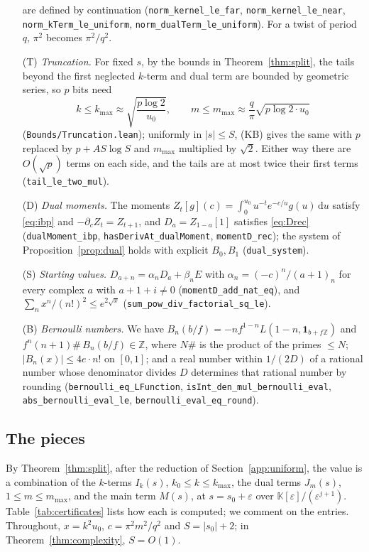 \documentclass[11pt,reqno]{amsart}
\theoremstyle{definition}
\theoremstyle{remark}
\newcommand{\dd}{\,\mathrm{d}}
\newcommand{\ZZ}{\mathbb{Z}}
\begin{document}
\begin{small}
\begin{itemize}
are defined by continuation (\nolinkurl{norm_kernel_le_far}, \nolinkurl{norm_kernel_le_near},
\nolinkurl{norm_kTerm_le_uniform}, \nolinkurl{norm_dualTerm_le_uniform}). For a twist of period $q$, $\pi^2$ becomes
$\pi^2/q^2$.
\item[(T)] \emph{Truncation.} For fixed $s$, by the bounds in Theorem~\ref{thm:split}, the tails beyond the first
neglected $k$-term and dual term are bounded by geometric series, so $p$ bits need
\begin{equation}\label{eq:counts}
  k \le k_{\max} \approx \sqrt{\frac{p\log 2}{u_0}}, \qquad m \le m_{\max} \approx \frac{q}{\pi}\sqrt{p\log 2\cdot u_0}
\end{equation}
(\nolinkurl{Bounds/Truncation.lean}); uniformly in $|s| \le S$, (KB) gives the same with $p$ replaced by
$p + AS\log S$ and $m_{\max}$ multiplied by $\sqrt2$. Either way there are $O(\sqrt p)$ terms on each side, and the
tails are at most twice their first terms (\nolinkurl{tail_le_two_mul}).
\item[(D)] \emph{Dual moments.} The moments $Z_t[g](c) = \int_0^{u_0}u^{-t}e^{-c/u}g(u)\dd u$ satisfy
\eqref{eq:ibp} and $-\partial_cZ_t = Z_{t+1}$, and $D_a = Z_{1-a}[1]$ satisfies \eqref{eq:Drec}
(\nolinkurl{dualMoment_ibp}, \nolinkurl{hasDerivAt_dualMoment}, \nolinkurl{momentD_rec}); the system of
Proposition~\ref{prop:dual} holds with explicit $B_0, B_1$ (\nolinkurl{dual_system}).
\item[(S)] \emph{Starting values.} $D_{a+n} = \alpha_nD_a + \beta_nE$ with $\alpha_n = (-c)^n/(a+1)_n$ for every
complex $a$ with $a + 1 + i \ne 0$ (\nolinkurl{momentD_add_nat_eq}), and $\sum_nx^n/(n!)^2 \le e^{2\sqrt x}$
(\nolinkurl{sum_pow_div_factorial_sq_le}).
\item[(B)] \emph{Bernoulli numbers.} We have $B_n(b/f) = -nf^{1-n}L(1-n, \mathbf 1_{b+f\ZZ})$ and
$f^n(n+1)\#\,B_n(b/f) \in \ZZ$, where $N\#$ is the product of the primes $\le N$; $|B_n(x)| \le 4e\cdot n!$ on $[0,1]$; and a real number within $1/(2D)$ of a rational number whose denominator divides
$D$ determines that rational number by rounding (\nolinkurl{bernoulli_eq_LFunction}, \nolinkurl{isInt_den_mul_bernoulli_eval},
\nolinkurl{abs_bernoulli_eval_le}, \nolinkurl{bernoulli_eval_eq_round}).
\end{itemize}

\subsection{The pieces}\label{app:pieces}
By Theorem~\ref{thm:split}, after the reduction of Section~\ref{app:uniform}, the value is a combination of the
$k$-terms $I_k(s)$, $k_0 \le k \le k_{\max}$, the dual terms $J_m(s)$, $1 \le m \le m_{\max}$, and the main term
$M(s)$, at $s = s_0 + \varepsilon$ over $\mathbb K[\varepsilon]/(\varepsilon^{j+1})$. Table~\ref{tab:certificates}
lists how each is computed; we comment on the entries. Throughout, $x = k^2u_0$, $c = \pi^2m^2/q^2$ and
$S = |s_0| + 2$; in Theorem~\ref{thm:complexity}, $S = O(1)$.


\end{small}
\end{document}
